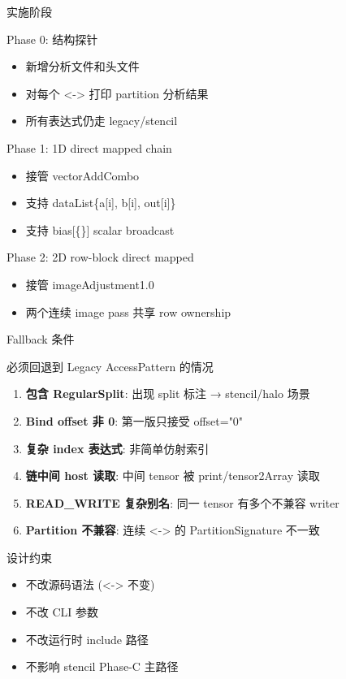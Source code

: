 \documentclass[aspectratio=169,10pt]{beamer}
\begin{document}
\begin{frame}{实施阶段}
\begin{block}{Phase 0: 结构探针}
\begin{itemize}
    \item 新增分析文件和头文件
    \item 对每个 <-> 打印 partition 分析结果
    \item 所有表达式仍走 legacy/stencil
\end{itemize}
\end{block}

\begin{block}{Phase 1: 1D direct mapped chain}
\begin{itemize}
    \item 接管 vectorAddCombo
    \item 支持 dataList\{a[i], b[i], out[i]\}
    \item 支持 bias[\{\}] scalar broadcast
\end{itemize}
\end{block}

\begin{block}{Phase 2: 2D row-block direct mapped}
\begin{itemize}
    \item 接管 imageAdjustment1.0
    \item 两个连续 image pass 共享 row ownership
\end{itemize}
\end{block}
\end{frame}

\begin{frame}{Fallback 条件}
\begin{block}{必须回退到 Legacy AccessPattern 的情况}
\begin{enumerate}
    \item \textbf{包含 RegularSplit}: 出现 split 标注 → stencil/halo 场景
    \item \textbf{Bind offset 非 0}: 第一版只接受 offset="0"
    \item \textbf{复杂 index 表达式}: 非简单仿射索引
    \item \textbf{链中间 host 读取}: 中间 tensor 被 print/tensor2Array 读取
    \item \textbf{READ\_WRITE 复杂别名}: 同一 tensor 有多个不兼容 writer
    \item \textbf{Partition 不兼容}: 连续 <-> 的 PartitionSignature 不一致
\end{enumerate}
\end{block}

\bigskip
\begin{alertblock}{设计约束}
\begin{itemize}
    \item 不改源码语法 (<-> 不变)
    \item 不改 CLI 参数
    \item 不改运行时 include 路径
    \item 不影响 stencil Phase-C 主路径
\end{itemize}
\end{alertblock}
\end{frame}
\end{document}
